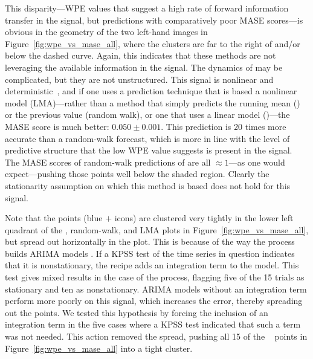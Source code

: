 This disparity---WPE values that suggest a high rate of forward
information transfer in the signal, but predictions with comparatively
poor MASE scores---is obvious in the geometry of the two left-hand
images in Figure~\ref{fig:wpe_vs_mase_all}, where the \col clusters
are far to the right of and/or below the dashed curve.  Again, this
indicates that these methods are not leveraging the available
information in the signal.  The dynamics of \col may be complicated,
but they are not unstructured.  This signal is nonlinear and
deterministic~\cite{mytkowicz09}, and if one uses a prediction
technique that is based a nonlinear model (LMA)---rather than a method
that simply predicts the running mean (\naive) or the previous value
(random walk), or one that uses a linear model (\arima)---the MASE
score is much better: $0.050 \pm 0.001$.  This prediction is 20 times
more accurate than a random-walk forecast, which is more in line with
the level of predictive structure that the low WPE value suggests is
present in the signal.  The MASE scores of random-walk predictions of
\col are all $\approx 1$---as one would expect---pushing those points
well below the shaded region.  Clearly the stationarity assumption on
which this method is based does not hold for this signal.

Note that the \col points (blue {\color{blue}$+$} icons) are clustered
very tightly in the lower left quadrant of the \naive, random-walk,
and LMA plots in Figure~\ref{fig:wpe_vs_mase_all}, but spread out
horizontally in the \arima plot.  This is because of the way the
\arima process builds ARIMA models \cite{autoARIMA}.  If a KPSS test
of the time series in question indicates that it is nonstationary, the
\arima recipe adds an integration term to the model.  This test gives
mixed results in the case of the \col process, flagging five of the 15
trials as stationary and ten as nonstationary.  ARIMA models without
an integration term perform more poorly on this signal, which
increases the error, thereby spreading out the points.  We tested this
hypothesis by forcing the inclusion of an integration term in the five
cases where a KPSS test indicated that such a term was not needed.
This action removed the spread, pushing all 15 of the \col ~ \arima
points in Figure~\ref{fig:wpe_vs_mase_all} into a tight cluster.


